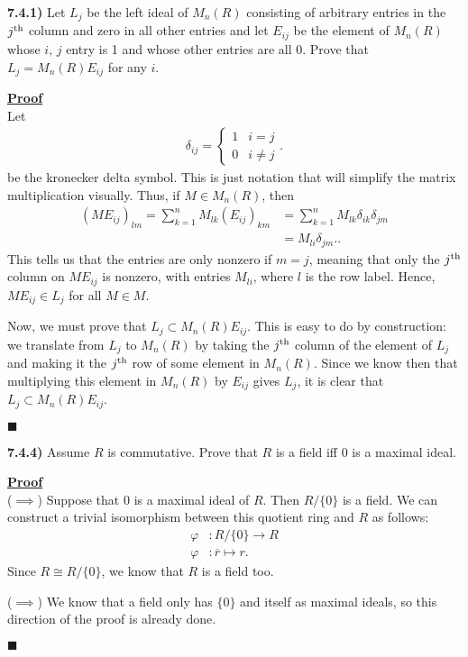 \documentclass[12pt,a4paper]{article}
\newcommand{\prob}[2]{\textbf{#1)} #2}
\newenvironment{proof}
{
\textbf{\underline{Proof}} \\
}
{
\hfill $\blacksquare$
}
\begin{document}
\prob{7.4.1}{
    Let $L_{j}$ be the left ideal of $M_{n}(R)$ consisting of arbitrary entries in the $j^{\rm th}$ column and zero in all other entries and let $E_{ij}$ be the element of $M_{n}(R)$ whose $i,\,j$ entry is 1 and whose other entries are all 0.
Prove that $L_{j} = M_{n}(R)E_{ij}$ for any $i$.
}

\begin{proof}
    Let 
    \begin{align*}
        \delta_{ij} = \begin{cases}
            1 & i = j \\
            0 & i \ne j
        \end{cases}
    .\end{align*}
    be the kronecker delta symbol.
    This is just notation that will simplify the matrix multiplication visually.
    Thus, if $M \in M_{n}(R)$, then 
    \begin{align*}
        (ME_{ij})_{lm} = \sum_{k=1}^{n} M_{lk}(E_{ij})_{km} &= \sum_{k=1}^{n} M_{lk}\delta_{ik}\delta_{jm} \\
        &= M_{li}\delta_{jm}.
    .\end{align*}
    This tells us that the entries are only nonzero if $m = j$, meaning that only the $j^{\rm th}$ column on $ME_{ij}$ is nonzero, with entries $M_{li}$, where $l$ is the row label.
    Hence, $ME_{ij} \in L_{j}$ for all $M \in M$.

    Now, we must prove that $L_{j} \subset M_{n}(R)E_{ij}$.
    This is easy to do by construction: we translate from $L_{j}$ to $M_{n}(R)$ by taking the $j^{\rm th}$ column of the element of $L_{j}$ and making it the $j^{\rm th}$ row of some element in $M_{n}(R)$.
    Since we know then that multiplying this element in $M_{n}(R)$ by $E_{ij}$ gives $L_{j}$, it is clear that $L_{j} \subset M_{n}(R)E_{ij}$.
\end{proof}

\prob{7.4.4}{
Assume $R$ is commutative.
Prove that $R$ is a field iff 0 is a maximal ideal.
}

\begin{proof}
    ($\implies$) Suppose that $0$ is a maximal ideal of $R$.
    Then $R/\{ 0 \}$ is a field.
    We can construct a trivial isomorphism between this quotient ring and $R$ as follows:
    \begin{align*}
        \varphi&: R / \{ 0 \} \to R \\
        \varphi&: \overline{r} \mapsto r
    .\end{align*}
    Since $R \cong R / \{ 0 \} $, we know that $R$ is a field too.

    ($\implies$) We know that a field only has $\{ 0 \} $ and itself as maximal ideals, so this direction of the proof is already done.
\end{proof}
\end{document}
